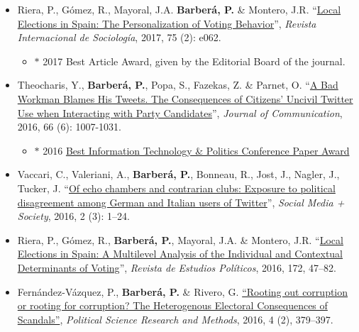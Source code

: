 \documentclass[margin,line,11pt]{resume}
\begin{document}
\begin{resume}
\begin{itemize}[leftmargin=5.5mm]
\item[13.] Riera, P., G\'{o}mez, R., Mayoral, J.A. \textbf{Barber\'{a}, P.} \& Montero, J.R. ``\href{http://revintsociologia.revistas.csic.es/index.php/revintsociologia/article/view/675/832}{Local Elections in Spain: The Personalization of Voting Behavior}'', \textit{Revista Internacional de Sociolog\'{i}a}, 2017, 75 (2): e062.
\begin{itemize}
\item[] $\ast$ 2017 Best Article Award, given by the Editorial Board of the journal.
\end{itemize}

\item[12.] Theocharis, Y., \textbf{Barber\'{a}, P.}, Popa, S., Fazekas, Z. \& Parnet, O. ``\href{http://onlinelibrary.wiley.com/doi/10.1111/jcom.12259/abstract}{A Bad Workman Blames His Tweets. The Consequences of Citizens' Uncivil Twitter Use when Interacting with Party Candidates}'', \textit{Journal of Communication}, 2016, 66 (6): 1007-1031.
\begin{itemize}
\item[] $\ast$ 2016 \href{http://www.apsanet.org/section-18-best-conference-paper-award}{Best Information Technology \& Politics Conference Paper Award}
\end{itemize}
    
\item[11.] Vaccari, C., Valeriani, A., \textbf{Barber\'{a}, P.}, Bonneau, R., Jost, J., Nagler, J., Tucker, J. ``\href{http://sms.sagepub.com/content/2/3/2056305116664221.abstract}{Of echo chambers and contrarian clubs: Exposure to political disagreement among German and Italian users of Twitter}'', \textit{Social Media + Society}, 2016, 2 (3): 1--24.

\item[10.] Riera, P., G\'{o}mez, R., \textbf{Barber\'{a}, P.}, Mayoral, J.A. \& Montero, J.R. ``\href{http://www.cepc.gob.es/publicaciones/revistas/revistaselectronicas?IDR=3&IDN=1360&IDA=37721}{Local Elections in Spain: A Multilevel Analysis of the Individual and Contextual Determinants of Voting}'', \textit{Revista de Estudios Pol\'{i}ticos}, 2016, 172, 47--82.

\item[9.] Fern\'{a}ndez-V\'{a}zquez, P., \textbf{Barber\'{a}, P.} \& Rivero, G. \href{http://dx.doi.org/10.1017/psrm.2015.8}{``Rooting out corruption or rooting for corruption? The Heterogenous Electoral Consequences of Scandals''}, \textit{Political Science Research and Methods}, 2016, 4 (2), 379--397.


\end{itemize}
\end{resume}
\end{document}
